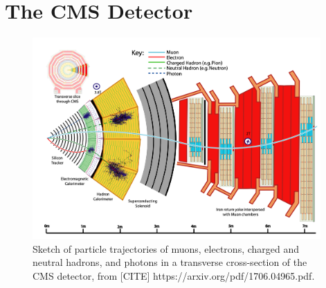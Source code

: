 \section{The CMS Detector}
\label{section:cms-detector}

\begin{figure}[ht]
    \centering
    \includegraphics[width=11cm]{figures/ch-2-cern-cms/sketch-cms-particle-interactions.png}
    \caption{Sketch of particle trajectories of muons, electrons, charged and neutral hadrons, and photons in a transverse cross-section of the CMS detector, from [CITE] https://arxiv.org/pdf/1706.04965.pdf.}
    \label{fig:sketch-cms-particle-interactions}
\end{figure}

